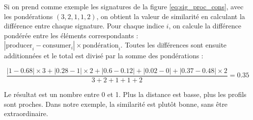 Si on prend comme exemple les signatures de la figure \ref{eq:sig_proc_cons},
avec les pondérations $(3, 2, 1, 1, 2)$, on obtient la valeur de similarité en
calculant la différence entre chaque signature. Pour chaque indice $i$, on
calcule la différence pondérée entre les éléments correspondants :
$|\text{producer}_i - \text{consumer}_i|\times\text{pondération}_i$. Toutes les
différences sont ensuite additionnées et le total est divisé par la somme des
pondérations :

$$
\frac{|1-0.68|\times 3+|0.28-1|\times 2+|0.6-0.12|+|0.02-0|+|0.37-0.48|\times 2}{3 + 2 + 1 + 1 + 2}=0.35
$$

Le résultat est un nombre entre 0 et 1. Plus la distance est basse, plus les
profils sont proches. Dans notre exemple, la similarité est plutôt bonne, sans
être extraordinaire.
